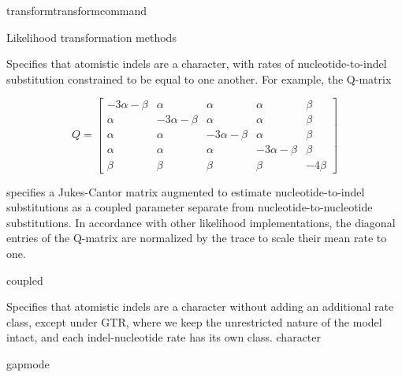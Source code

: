 \begin{command}{transform}{transformcommand}
\begin{arguments}
\begin{argumentgroup}{Likelihood transformation methods}
{\begin{description}
                            {Specifies that atomistic indels are a character,
                            with rates of nucleotide-to-indel substitution
                            constrained to be equal to one another. For example,
                            the Q-matrix

                            \begin{equation*}
                                Q =
                                    \begin{bmatrix}
                                        -3 \alpha - \beta & \alpha & \alpha & \alpha & \beta \\
                                        \alpha & -3 \alpha - \beta & \alpha & \alpha & \beta \\
                                        \alpha & \alpha & -3 \alpha - \beta & \alpha & \beta \\
                                        \alpha & \alpha & \alpha & -3 \alpha - \beta & \beta \\
                                        \beta & \beta & \beta & \beta & -4 \beta
                                \end{bmatrix}
                            \end{equation*}

                            specifies a Jukes-Cantor matrix augmented to
                            estimate nucleotide-to-indel substitutions as a
                            coupled parameter separate from
                            nucleotide-to-nucleotide substitutions. In
                            accordance with other likelihood implementations,
                            the diagonal entries of the Q-matrix are normalized
                            by the trace to scale their mean rate to one.}
                            {coupled}

                            {Specifies that atomistic indels are a character
                            without adding an additional rate class, except
                            under GTR, where we keep the unrestricted nature of the
                            model intact, and each indel-nucleotide rate has its
                            own class.}
                            {character}

                    \end{description}}
                {gapmode}


\end{argumentgroup}
\end{arguments}
\end{command}

